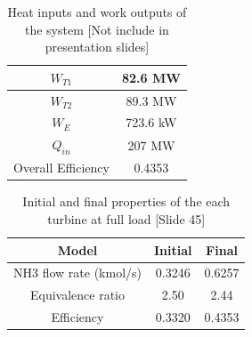   \begin{table} [h]
\begin{center}
\caption{Heat inputs and work outputs of the system [Not include in presentation slides]} \label{tab:powerdata}
\begin{tabular}{ |c|c| }
 \hline
  $W_{T1}$ & 82.6 MW\\ 
 \hline
  $W_{T2}$ & 89.3 MW\\
  \hline
  $W_E$ & 723.6 kW\\
 \hline
 $Q_{in}$ & 207 MW\\
 \hline
 Overall Efficiency & 0.4353\\ 
 \hline
\end{tabular}
\end{center}  
\end{table}

  \begin{table} [h]
\begin{center}
\caption{Initial and final properties of the each turbine at full load [Slide 45]} \label{tab:powerdata}
\begin{tabular}{ |c|c|c| }
 \hline
  Model & Initial & Final\\ 
 \hline
   NH3 flow rate (kmol/s) & 0.3246 & 0.6257\\
  \hline
  Equivalence ratio & 2.50 & 2.44\\
 \hline
  Efficiency & 0.3320 & 0.4353\\
 \hline
\end{tabular}
\end{center}  
\end{table}





%
